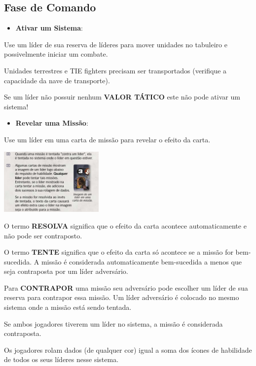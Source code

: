 \documentclass[11pt]{article}
\begin{document}
\subsection{Fase de Comando}
\label{sec:org27324b9}

\begin{itemize}
\item \textbf{Ativar um Sistema}:
\end{itemize}

Use um líder de sua reserva de líderes para mover unidades no tabuleiro e possivelmente iniciar um combate.

Unidades terrestres e TIE fighters precisam ser transportados (verifique a capacidade da nave de transporte).

Se um líder não possuir nenhum \textbf{VALOR TÁTICO} este não pode ativar um sistema!

\begin{itemize}
\item \textbf{Revelar uma Missão}:
\end{itemize}

Use um líder em uma carta de missão para revelar o efeito da carta.

\begin{center}
\includegraphics[width=2.0in]{./lider-effect.png}
\end{center}

O termo \textbf{RESOLVA} significa que o efeito da carta acontece automaticamente e não pode ser contraposto.

O termo \textbf{TENTE} significa que o efeito da carta só acontece se a missão for bem-sucedida. A missão é considerada automaticamente bem-sucedida a menos que seja contraposta por um líder adversário.

Para \textbf{CONTRAPOR} uma missão seu adversário pode escolher um líder de sua reserva para contrapor essa missão. Um líder adversário é colocado no mesmo sistema onde a missão está sendo tentada.

Se ambos jogadores tiverem um líder no sistema, a missão é considerada contraposta.

Os jogadores rolam dados (de qualquer cor) igual a soma dos ícones de habilidade de todos os seus líderes nesse sistema.
\end{document}
